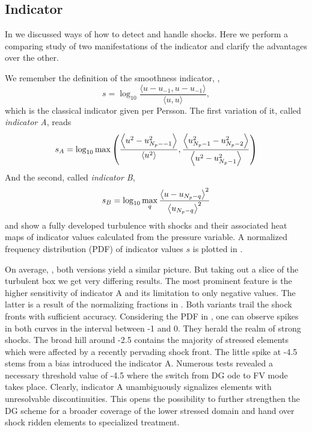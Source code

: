 \subsection{Indicator}
In  we discussed ways of how to detect and handle shocks.
Here we perform a comparing study of two manifestations of the 
indicator and clarify the advantages over the other.

We remember the definition of the smoothness indicator, ,
\begin{equation}
    s = \log_{10} \frac{\langle u - u_{-1}, u - u_{-1} \rangle}{\langle u, u \rangle},
\end{equation}
which is the classical indicator given per Persson.
The first variation of it, called \emph{indicator A}, reads
\begin{equation}
\label{eqn:indicator-A}
    s_A = \log_{10} \max \left(
        \frac{\left\langle u^2 - u_{N_p--1}^2\right\rangle}{\left\langle u^2\right\rangle},
        \frac{\left\langle u_{N_p-1}^2 - u_{N_p-2}^2\right\rangle}{\left\langle u^2 - u_{N_p-1}^2\right\rangle}
    \right)
\end{equation}
And the second, called \emph{indicator B},
\begin{equation}
    s_B = \log_{10} \max_q \frac{\left\langle u - u_{N_p-q}\right\rangle^2}{\left\langle u_{N_p-q}\right\rangle^2}
\end{equation}
 and  show a fully
developed turbulence with shocks and their associated heat maps of indicator
values calculated from the pressure variable. A normalized frequency
distribution (PDF) of indicator values $s$ is plotted in .

On average, , both versions yield a similar picture.
But taking out a slice of the turbulent box we get very differing results.  The
most prominent feature is the higher sensitivity of indicator A and its
limitation to only negative values. The latter is a result of the normalizing
fractions in . Both variants trail the shock fronts with
sufficient accuracy. Considering the PDF in , one can
observe spikes in both curves in the interval between -1 and 0. They herald the
realm of strong shocks. The broad hill around -2.5 contains the majority of
stressed elements which were affected by a recently pervading shock front.  The
little spike at -4.5 stems from a bias introduced the indicator A. Numerous
tests revealed a necessary threshold value of -4.5 where the switch from DG
ode to FV mode takes place. Clearly, indicator A unambiguously signalizes
elements with unresolvable discontinuities. This opens the possibility to
further strengthen the DG scheme for a broader coverage of the lower stressed
domain and hand over shock ridden elements to specialized treatment.
